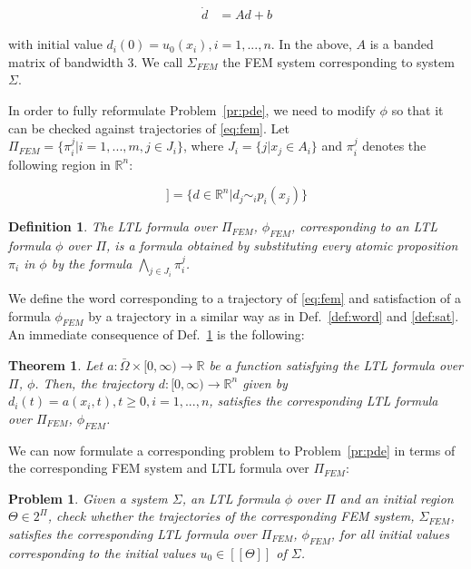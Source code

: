 \documentclass{article}
\newtheorem{theorem}{Theorem}
\newtheorem{definition}{Definition}
\newtheorem{problem}{Problem}
\newcommand*{\R}{\mathbb{R}}
\newcommand*{\psat}[1]{[[#1]]}
\begin{document}
\begin{equation}\label{eq:fem}
    \begin{aligned}
        \dot{d} &= A d + b
    \end{aligned}
\end{equation}

with initial value $d_i(0) = u_0(x_i), i = 1,...,n$. In the above, $A$ is a
banded matrix of bandwidth 3. We call $\Sigma_{FEM}$ the FEM system
corresponding to system $\Sigma$.

In order to fully reformulate Problem~\ref{pr:pde}, we need to modify $\phi$ so
that it can be checked against trajectories of \eqref{eq:fem}. Let $\Pi_{FEM} =
\{\pi_i^j | i =1,...,m, j \in J_i\}$, where $J_i = \{j | x_j \in A_i\}$ and
$\pi_i^j$ denotes the following region in $\R^n$:

\begin{equation}
    \psat{\pi_i^j} = \{d \in \R^n | d_j \sim_i p_i(x_j)\}
\end{equation}

\begin{definition}\label{def:femformula}
    The LTL formula over $\Pi_{FEM}$, $\phi_{FEM}$, corresponding to an LTL formula
    $\phi$ over $\Pi$, is a formula obtained by substituting every atomic
    proposition $\pi_i$ in $\phi$ by the formula $\bigwedge_{j \in J_i}
    \pi_i^j$.
\end{definition}

We define the word corresponding to a trajectory of \eqref{eq:fem} and
satisfaction of a formula $\phi_{FEM}$ by a trajectory in a similar way as in
Def.~\ref{def:word} and \ref{def:sat}. An immediate consequence of
Def.~\ref{def:femformula} is the following:

\begin{theorem}\label{th:equiv}
    Let $a : \bar\Omega \times [0, \infty) \rightarrow \R$ be a function
    satisfying the LTL formula over $\Pi$, $\phi$. Then, the trajectory $d : [0,
    \infty) \rightarrow \R^n$ given by $d_i(t) = a(x_i, t), t \geq 0, i =
    1,...,n$, satisfies the corresponding LTL formula over $\Pi_{FEM}$, $\phi_{FEM}$.
\end{theorem}

We can now formulate a corresponding problem to Problem~\ref{pr:pde} in terms of 
the corresponding FEM system and LTL formula over $\Pi_{FEM}$:

\begin{problem}\label{pr:fem}
    Given a system $\Sigma$, an LTL formula $\phi$ over $\Pi$ and an initial
    region $\Theta \in 2^\Pi$, check whether the trajectories of the corresponding
    FEM system, $\Sigma_{FEM}$, satisfies the corresponding LTL formula over
    $\Pi_{FEM}$, $\phi_{FEM}$, for all initial values corresponding to the
    initial values $u_0 \in \psat{\Theta}$ of $\Sigma$.
\end{problem}
\end{document}
